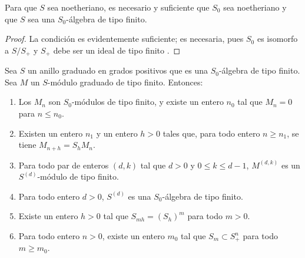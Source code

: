 \documentclass[oneside,10pt]{amsart}
\renewcommand{\leq}{\leqslant}
\renewcommand{\geq}{\geqslant}
\let\EGAOriginalLabel\label
\renewcommand{\label}[1]{\phantomsection\EGAOriginalLabel{#1}}
\begin{document}
\begin{corollary}[2.1.5]
\label{II.2.1.5-fr}
Para que $S$ sea noetheriano, es necesario y suficiente que $S_0$ sea noetheriano y que $S$ sea una $S_0$-álgebra de tipo finito.
\end{corollary}

\begin{proof}
La condición es evidentemente suficiente; es necesaria, pues $S_0$ es isomorfo a $S/S_+$ y $S_+$ debe ser un ideal de tipo finito .
\end{proof}

\begin{lemma}[2.1.6]
\label{II.2.1.6-fr}
Sea $S$ un anillo graduado en grados positivos que es una $S_0$-álgebra de tipo finito.
Sea $M$ un $S$-módulo graduado de tipo finito.
Entonces:
\begin{enumerate}
  \item[{\rm(i)}] Los $M_n$ son $S_0$-módulos de tipo finito, y existe un entero $n_0$ tal que $M_n=0$ para $n\leq n_0$.
  \item[{\rm(ii)}] Existen un entero $n_1$ y un entero $h>0$ tales que, para todo entero $n\geq n_1$, se tiene $M_{n+h}=S_hM_n$.
  \item[{\rm(iii)}] Para todo par de enteros $(d,k)$ tal que $d>0$ y $0\leq k\leq d-1$, $M^{(d,k)}$ es un $S^{(d)}$-módulo de tipo finito.
  \item[{\rm(iv)}] Para todo entero $d>0$, $S^{(d)}$ es una $S_0$-álgebra de tipo finito.
  \item[{\rm(v)}] Existe un entero $h>0$ tal que $S_{mh}=(S_h)^m$ para todo $m>0$.
  \item[{\rm(vi)}] Para todo entero $n>0$, existe un entero $m_0$ tal que $S_m\subset S_+^n$ para todo $m\geq m_0$.
\end{enumerate}
\end{lemma}
\end{document}
